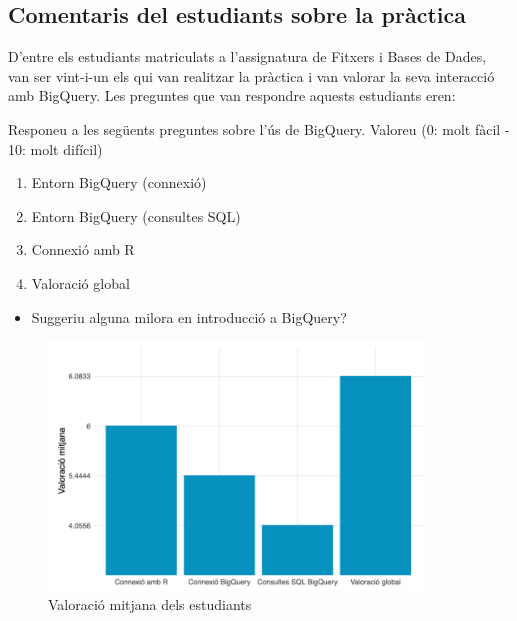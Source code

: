 \documentclass[12pt,longbibliography]{article}
\theoremstyle{definition}
\theoremstyle{remark}
\begin{document}
\subsection{Comentaris del estudiants sobre la pràctica}

D'entre els estudiants matriculats a l'assignatura de Fitxers i Bases de Dades, van ser vint-i-un els qui van realitzar la pràctica i van valorar la seva interacció amb BigQuery. Les preguntes que van respondre aquests estudiants eren:


Responeu a les següents preguntes sobre l'ús de BigQuery. Valoreu (0: molt fàcil - 10: molt difícil)


\begin{enumerate}

\item Entorn BigQuery (connexió)

\item Entorn BigQuery (consultes SQL)

\item Connexió amb R

\item Valoració global

\end{enumerate}

\begin{itemize}

\item Suggeriu alguna milora en introducció a BigQuery?

\end{itemize}

\begin{figure}[h!]
\begin{center}
\includegraphics[width=10cm]{val}
\end{center}
\caption{Valoració mitjana dels estudiants}
\label{fig:val}
\end{figure}
\end{document}

